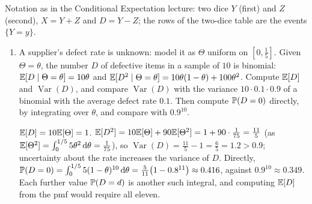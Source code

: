 \providecommand{\Var}{\operatorname{Var}}
\providecommand{\Cov}{\operatorname{Cov}}
\noindent Notation as in the Conditional Expectation lecture: two dice $Y$ (first) and $Z$ (second), $X=Y+Z$ and $D=Y-Z$; the rows of the two-dice table are the events $\{Y=y\}$.

\begin{enumerate}[series=quiz,label=\arabic*.,leftmargin=2.6em]
\item A supplier's defect rate is unknown: model it as $\Theta$ uniform on $[0,\tfrac15]$. Given $\Theta=\theta$, the number $D$ of defective items in a sample of $10$ is binomial: $\mathbb{E}[D\mid\Theta=\theta]=10\theta$ and $\mathbb{E}[D^2\mid\Theta=\theta]=10\theta(1-\theta)+100\theta^2$. Compute $\mathbb{E}[D]$ and $\Var(D)$, and compare $\Var(D)$ with the variance $10\cdot0.1\cdot0.9$ of a binomial with the average defect rate $0.1$. Then compute $\mathbb{P}(D=0)$ directly, by integrating over $\theta$, and compare with $0.9^{10}$.
\begin{solution}
$\mathbb{E}[D]=10\mathbb{E}[\Theta]=1$. $\mathbb{E}[D^2]=10\mathbb{E}[\Theta]+90\mathbb{E}[\Theta^2]=1+90\cdot\tfrac{1}{75}=\tfrac{11}5$ (as $\mathbb{E}[\Theta^2]=\int_0^{1/5}5\theta^2\,\mathrm{d}\theta=\tfrac1{75}$), so $\Var(D)=\tfrac{11}5-1=\tfrac65=1.2>0.9$; uncertainty about the rate increases the variance of $D$.
Directly, $\mathbb{P}(D=0)=\int_0^{1/5}5(1-\theta)^{10}\,\mathrm{d}\theta=\tfrac5{11}\big(1-0.8^{11}\big)\approx0.416$, against $0.9^{10}\approx0.349$. Each further value $\mathbb{P}(D=d)$ is another such integral, and computing $\mathbb{E}[D]$ from the pmf would require all eleven.
\end{solution}


\end{enumerate}
